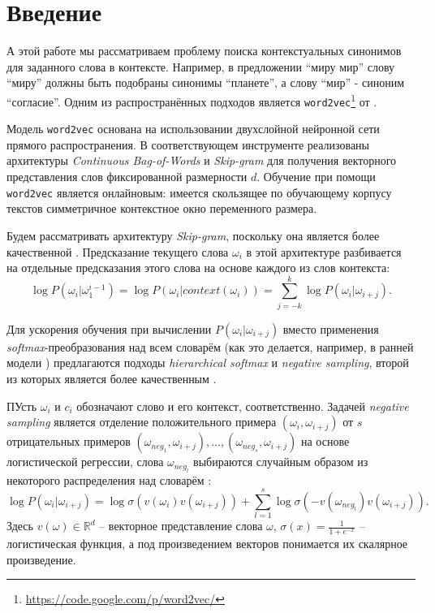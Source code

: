 \documentclass[oneside,senior,etd]{BYUPhys}
\begin{document}
\fixmargins
 \makepreliminarypages

\oneandhalfspace

\tableofcontents


\section{Введение}
\label{sec:Chapter1} 

А этой работе мы рассматриваем проблему поиска контекстуальных синонимов для заданного слова в контексте. Например, в предложении ``миру мир'' слову ``миру'' должны быть подобраны синонимы ``планете'', а слову ``мир'' - синоним ``согласие''. Одним из распространённых подходов является \texttt{word2vec}\footnote{\url{https://code.google.com/p/word2vec/}}  от \cite{mikolov1}.

Модель \texttt{word2vec} основана на использовании двухслойной нейронной сети прямого распространения. В соответствующем инструменте реализованы архитектуры \textit{Continuous Bag-of-Words} и \textit{Skip-gram} \cite{mikolov1} для получения векторного представления слов фиксированной размерности \(d\). Обучение при помощи \texttt{word2vec} является онлайновым: имеется скользящее по обучающему корпусу текстов симметричное контекстное окно переменного размера.

Будем рассматривать архитектуру \textit{Skip-gram}, поскольку она является более качественной \cite{mikolov1}. Предсказание текущего слова \(\omega_i\) в этой архитектуре разбивается на отдельные предсказания этого слова на основе каждого из слов контекста: \[\log P(\omega_i|\omega_1^{i-1}) = \log P(\omega_i|context(\omega_i)) = \sum_{j=-k}^k \log P(\omega_i|\omega_{i+j}).\]

Для ускорения обучения при вычислении \(P(\omega_i|\omega_{i+j})\) вместо применения \textit{softmax}-преобразования над всем словарём (как это делается, например, в ранней модели \cite{bengio}) предлагаются подходы \textit{hierarchical softmax} и \textit{negative sampling}, второй из которых является более качественным \cite{mikolov2}.

ПУсть $\omega_i$ и $c_i$ обозначают слово и его контекст, соответственно. Задачей \textit{negative sampling} является отделение положительного примера \((\omega_i, \omega_{i+j})\) от \(s\) отрицательных примеров \((\omega_{neg_1}, \omega_{i+j}), ..., (\omega_{neg_s}, \omega_{i+j})\) на основе логистической регрессии, слова \(\omega_{neg_l}\) выбираются случайным образом из некоторого распределения над словарём \cite{negative}: \[\log P(\omega_i|\omega_{i+j}) = \log \sigma (v(\omega_i) v(\omega_{i+j})) + \sum_{l=1}^s \log \sigma (- v(\omega_{neg_l}) v(\omega_{i+j})).\]
Здесь \(v(\omega) \in \mathbb{R}^d\) -- векторное представление слова \(\omega\), \(\sigma(x) = \frac{1}{1+e^{-x}}\) -- логистическая функция, а под произведением векторов понимается их скалярное произведение.
\end{document}
